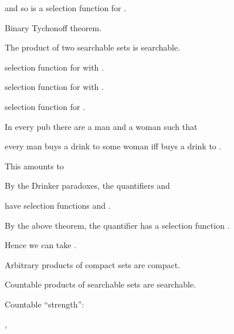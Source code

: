 \documentclass%
[%
Screen4to3,
]{foils}
\begin{document}
\quad and so \darkblue{$\varepsilon \otimes \delta$} is a selection function for
\darkblue{$\phi \otimes \gamma$}.


Binary Tychonoff theorem.

\vfill

The product of two searchable sets is searchable.

\vfill


 selection function for  with .

 selection function for  with .

\darkblue{$\varepsilon \otimes \delta$} selection function for .



In every pub there are a man  and a woman  such that

every man buys a drink to some woman iff  buys a drink to .

\vfill


This amounts to 

By the Drinker paradoxes, the quantifiers  and 

have
selection functions  and . 

By the above theorem, the quantifier  has
a selection function . 

Hence we can take .



Arbitrary products of compact sets are compact.

Countable products of searchable sets are searchable.

\vfill

Countable ``strength'':

\qquad \qquad {},
\end{document}
